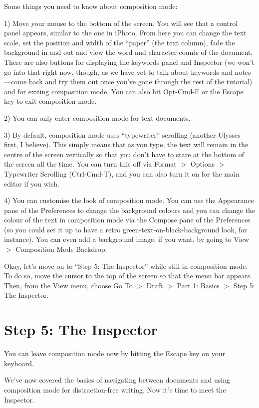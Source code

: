 \documentclass[10pt,oneside]{memoir}
\begin{document}
Some things you need to know about composition mode:


1) Move your mouse to the bottom of the screen. You will see that a control panel appears, similar to the one in iPhoto. From here you can change the text scale, set the position and width of the ``paper'' (the text column), fade the background in and out and view the word and character counts of the document. There are also buttons for displaying the keywords panel and Inspector (we won't go into that right now, though, as we have yet to talk about keywords and notes---come back and try them out once you've gone through the rest of the tutorial) and for exiting composition mode. You can also hit Opt-Cmd-F or the Escape key to exit composition mode.


2) You can only enter composition mode for text documents.


3) By default, composition mode uses ``typewriter'' scrolling (another Ulysses first, I believe). This simply means that as you type, the text will remain in the centre of the screen vertically so that you don't have to stare at the bottom of the screen all the time. You can turn this off via Format $>$ Options $>$ Typewriter Scrolling (Ctrl-Cmd-T), and you can also turn it on for the main editor if you wish.


4) You can customise the look of composition mode. You can use the Appearance pane of the Preferences to change the background colours and you can change the colour of the text in composition mode via the Compose pane of the Preferences (so you could set it up to have a retro green-text-on-black-background look, for instance). You can even add a background image, if you want, by going to View $>$ Composition Mode Backdrop.


Okay, let's move on to ``Step 5: The Inspector'' while still in composition mode. To do so, move the cursor to the top of the screen so that the menu bar appears. Then, from the View menu, choose Go To $>$ Draft $>$ Part 1: Basics $>$ Step 5: The Inspector.


\pagebreak \chapter{Step 5: The Inspector}
\label{step5:theinspector}

You can leave composition mode now by hitting the Escape key on your keyboard.


We've now covered the basics of navigating between documents and using composition mode for distraction-free writing. Now it's time to meet the Inspector.
\end{document}
